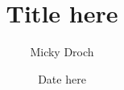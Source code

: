 \documentclass[a4paper,10pt]{article}
\title{Title here}
\author{Micky Droch}
\date{Date here}
\begin{document}
\maketitle

\begin{abstract}

\end{abstract}
\end{document}
